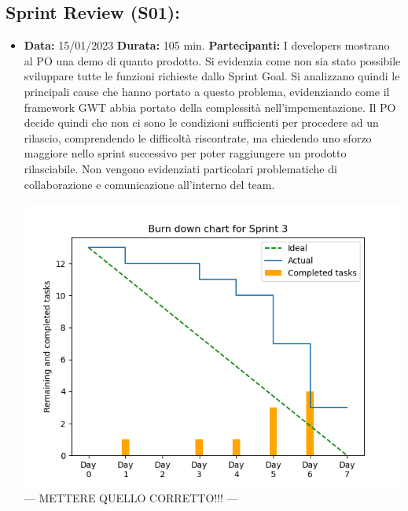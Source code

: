 \begin{landscape}
        \subsection{Sprint Review (S01):}
        \begin{itemize}
            \item \textbf{Data:} 15/01/2023
            \newline \textbf{Durata:} 105 min.
            \newline \textbf{Partecipanti:} \unoP \uno
            \newline
            \newline I developers mostrano al PO una demo di quanto prodotto. Si evidenzia come non sia stato possibile sviluppare tutte le funzioni richieste dallo Sprint Goal. Si analizzano quindi le principali cause che hanno portato a questo problema, evidenziando come il framework GWT abbia portato della complessità nell'impementazione. Il PO decide quindi che non ci sono le condizioni sufficienti per procedere ad un rilascio, comprendendo le difficoltà riscontrate, ma chiedendo uno sforzo maggiore nello sprint successivo per poter raggiungere un prodotto rilasciabile. Non vengono evidenziati particolari problematiche di collaborazione e comunicazione all'interno del team.

            \includegraphics[scale=0.8]{Sprint03_BurnDownChart}
            --- METTERE QUELLO CORRETTO!!! ---

        \end{itemize}
        \newpage

\end{landscape}
